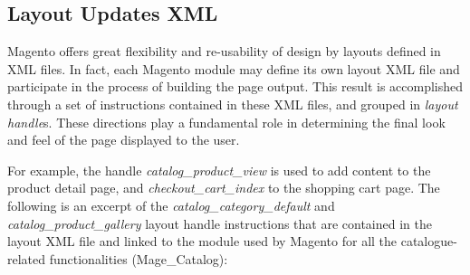 \subsection{Layout Updates XML}

Magento offers great flexibility and re-usability of design by layouts defined in XML files. In fact, each Magento module may define its own layout XML file and participate in the process of building the page output. This result is accomplished through a set of instructions contained in these XML files, and grouped in \textit{layout handle}s. These directions play a fundamental role in determining the final look and feel of the page displayed to the user.

For example, the handle \textit{catalog\_product\_view} is used to add content to the product detail page, and \textit{checkout\_cart\_index} to the shopping cart page. The following is an excerpt of the \textit{catalog\_category\_default} and \textit{catalog\_product\_gallery} layout handle instructions that are contained in the layout XML file and linked to the module used by Magento for all the catalogue-related functionalities (Mage\_Catalog):

